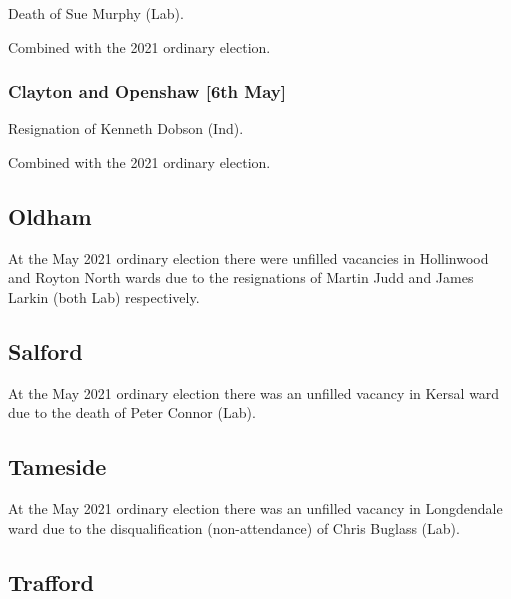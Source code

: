 \documentclass[a4paper,openany]{book}
\begin{document}
\begin{resultsiii}

Death of Sue Murphy (Lab).

Combined with the 2021 ordinary election.

\subsubsection*{Clayton and Openshaw \hspace*{\fill}\nolinebreak[1]%
	\enspace\hspace*{\fill}
	[6th May]}


Resignation of Kenneth Dobson (Ind).

Combined with the 2021 ordinary election.

\subsection*{Oldham}

At the May 2021 ordinary election there were unfilled vacancies in Hollinwood and Royton North wards due to the resignations of Martin Judd and James Larkin (both Lab) respectively.

\subsection*{Salford}

At the May 2021 ordinary election there was an unfilled vacancy in Kersal ward due to the death of Peter Connor (Lab).

\subsection*{Tameside}

At the May 2021 ordinary election there was an unfilled vacancy in Longdendale ward due to the disqualification (non-attendance) of Chris Buglass (Lab).

\subsection*{Trafford}


\end{resultsiii}
\end{document}
